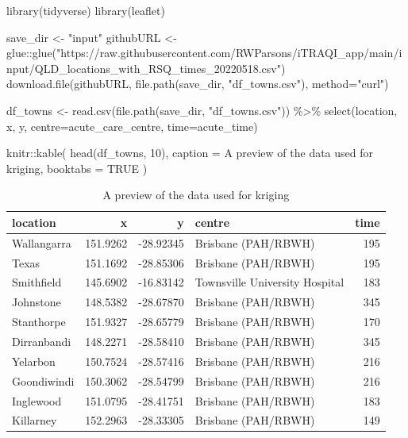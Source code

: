\documentclass[
]{book}
\newenvironment{Shaded}{\begin{snugshade}}{\end{snugshade}}
\newcommand{\AttributeTok}[1]{\textcolor[rgb]{0.77,0.63,0.00}{#1}}
\newcommand{\ConstantTok}[1]{\textcolor[rgb]{0.00,0.00,0.00}{#1}}
\newcommand{\DecValTok}[1]{\textcolor[rgb]{0.00,0.00,0.81}{#1}}
\newcommand{\FunctionTok}[1]{\textcolor[rgb]{0.00,0.00,0.00}{#1}}
\newcommand{\NormalTok}[1]{#1}
\newcommand{\OtherTok}[1]{\textcolor[rgb]{0.56,0.35,0.01}{#1}}
\newcommand{\SpecialCharTok}[1]{\textcolor[rgb]{0.00,0.00,0.00}{#1}}
\newcommand{\StringTok}[1]{\textcolor[rgb]{0.31,0.60,0.02}{#1}}
\begin{document}
\begin{Shaded}
\begin{Highlighting}[]
\FunctionTok{library}\NormalTok{(tidyverse)}
\FunctionTok{library}\NormalTok{(leaflet)}

\NormalTok{save\_dir }\OtherTok{\textless{}{-}} \StringTok{"input"}
\NormalTok{githubURL }\OtherTok{\textless{}{-}}\NormalTok{ glue}\SpecialCharTok{::}\FunctionTok{glue}\NormalTok{(}\StringTok{"https://raw.githubusercontent.com/RWParsons/iTRAQI\_app/main/input/QLD\_locations\_with\_RSQ\_times\_20220518.csv"}\NormalTok{)}
\FunctionTok{download.file}\NormalTok{(githubURL, }\FunctionTok{file.path}\NormalTok{(save\_dir, }\StringTok{"df\_towns.csv"}\NormalTok{), }\AttributeTok{method=}\StringTok{"curl"}\NormalTok{)}

\NormalTok{df\_towns }\OtherTok{\textless{}{-}} \FunctionTok{read.csv}\NormalTok{(}\FunctionTok{file.path}\NormalTok{(save\_dir, }\StringTok{"df\_towns.csv"}\NormalTok{)) }\SpecialCharTok{\%\textgreater{}\%}
  \FunctionTok{select}\NormalTok{(location, x, y, }\AttributeTok{centre=}\NormalTok{acute\_care\_centre, }\AttributeTok{time=}\NormalTok{acute\_time)}

\NormalTok{knitr}\SpecialCharTok{::}\FunctionTok{kable}\NormalTok{(}
  \FunctionTok{head}\NormalTok{(df\_towns, }\DecValTok{10}\NormalTok{), }\AttributeTok{caption =} \StringTok{\textquotesingle{}A preview of the data used for kriging\textquotesingle{}}\NormalTok{,}
  \AttributeTok{booktabs =} \ConstantTok{TRUE}
\NormalTok{)}
\end{Highlighting}
\end{Shaded}

\begin{table}

\caption{\label{tab:data-for-kriging}A preview of the data used for kriging}
\centering
\begin{tabular}[t]{lrrlr}
\toprule
location & x & y & centre & time\\
\midrule
Wallangarra & 151.9262 & -28.92345 & Brisbane (PAH/RBWH) & 195\\
Texas & 151.1692 & -28.85306 & Brisbane (PAH/RBWH) & 195\\
Smithfield & 145.6902 & -16.83142 & Townsville University Hospital & 183\\
Johnstone & 148.5382 & -28.67870 & Brisbane (PAH/RBWH) & 345\\
Stanthorpe & 151.9327 & -28.65779 & Brisbane (PAH/RBWH) & 170\\
\addlinespace
Dirranbandi & 148.2271 & -28.58410 & Brisbane (PAH/RBWH) & 345\\
Yelarbon & 150.7524 & -28.57416 & Brisbane (PAH/RBWH) & 216\\
Goondiwindi & 150.3062 & -28.54799 & Brisbane (PAH/RBWH) & 216\\
Inglewood & 151.0795 & -28.41751 & Brisbane (PAH/RBWH) & 183\\
Killarney & 152.2963 & -28.33305 & Brisbane (PAH/RBWH) & 149\\
\bottomrule
\end{tabular}
\end{table}
\end{document}
